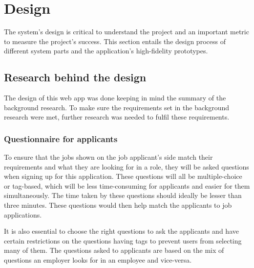 \chapter{Design}
The system's design is critical to understand the project and an important metric to measure the project's success. This section entails the design process of different system parts and the application's high-fidelity prototypes.

\section{Research behind the design}
The design of this web app was done keeping in mind the summary of the background research. To make sure the requirements set in the background research were met, further research was needed to fulfil these requirements.

\subsection{Questionnaire for applicants}
To ensure that the jobs shown on the job applicant's side match their requirements and what they are looking for in a role, they will be asked questions when signing up for this application. These questions will all be multiple-choice or tag-based, which will be less time-consuming for applicants and easier for them simultaneously. The time taken by these questions should ideally be lesser than three minutes. These questions would then help match the applicants to job applications. 

It is also essential to choose the right questions to ask the applicants and have certain restrictions on the questions having tags to prevent users from selecting many of them. The questions asked to applicants are based on the mix of questions an employer looks for in an employee and vice-versa. \parencite{Reference28}

